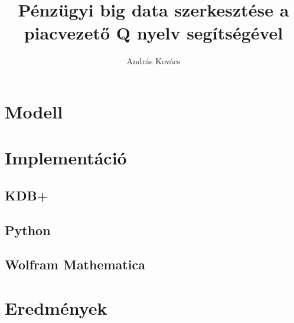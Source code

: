 \documentclass[]{article}
\title{Pénzügyi big data szerkesztése a piacvezető Q nyelv segítségével}
\author{András Kovács}
\begin{document}
\maketitle

\begin{abstract}
	


\end{abstract}

\section{Modell}



\section{Implementáció}

\subsection{KDB+}
\subsection{Python}
\subsection{Wolfram Mathematica}


\section{Eredmények}
\end{document}
